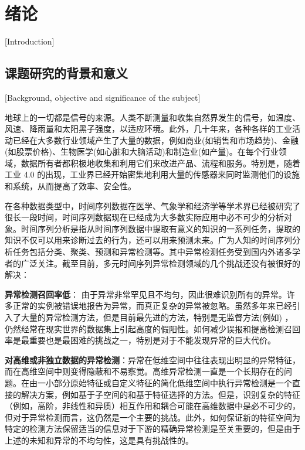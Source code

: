 
\chapter{绪论}[Introduction]

\section{课题研究的背景和意义}[Background, objective and significance of the subject]

地球上的一切都是信号的来源。人类不断测量和收集自然界发生的信号，如温度、风速、降雨量和太阳黑子强度，以适应环境。此外，几十年来，各种各样的工业活动已经在大多数行业领域产生了大量的数据，例如商业(如销售和市场趋势)、金融(如股票价格)、生物医学(如心脏和大脑活动)和制造业(如产量)。在每个行业领域，数据所有者都积极地收集和利用它们来改进产品、流程和服务。特别是，随着工业 4.0 的出现，工业界已经开始密集地利用大量的传感器来同时监测他们的设施和系统，从而提高了效率、安全性\cite{yellow1}。

在各种数据类型中，时间序列数据在医学、气象学和经济学等学术界已经被研究了很长一段时间，时间序列数据现在已经成为大多数实际应用中必不可少的分析对象。时间序列分析是指从时间序列数据中提取有意义的知识的一系列任务，提取的知识不仅可以用来诊断过去的行为，还可以用来预测未来。广为人知的时间序列分析任务包括分类、聚类、预测和异常检测等。其中异常检测任务受到国内外诸多学者的广泛关注\cite{none5, none4, none3, none2, none1}。截至目前，多元时间序列异常检测领域的几个挑战还没有被很好的解决：

\textbf{异常检测召回率低}： 由于异常非常罕见且不均匀，因此很难识别所有的异常。许多正常的实例被错误地报告为异常，而真正复杂的异常被忽略。虽然多年来已经引入了大量的异常检测方法，但是目前最先进的方法，特别是无监督方法(例如\cite{orange17,orange84}) ，仍然经常在现实世界的数据集上引起高度的假阳性\cite{orange20,orange115}。如何减少误报和提高检测召回率是最重要也是最困难的挑战之一，特别是对于不能发现异常的巨大代价。

\textbf{对高维或非独立数据的异常检测}：异常在低维空间中往往表现出明显的异常特征，而在高维空间中则变得隐蔽和不易察觉。高维异常检测一直是一个长期存在的问题。在由一小部分原始特征或自定义特征的简化低维空间中执行异常检测是一个直接的解决方案，例如基于子空间的\cite{orange70,orange77,orange84,orange123}和基于特征选择的方法\cite{orange12,orange109,orange111}。但是，识别复杂的特征（例如，高阶，非线性和异质）相互作用和耦合\cite{orange22}可能在高维数据中是必不可少的，但对于异常检测而言，这仍然是一个主要的挑战。此外，如何保证新的特征空间为特定的检测方法保留适当的信息对于下游的精确异常检测是至关重要的，但是由于上述的未知和异常的不均匀性，这是具有挑战性的。
 
